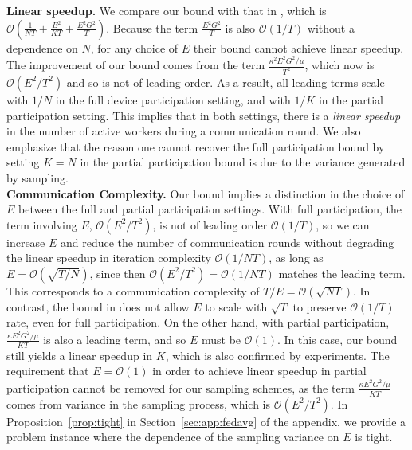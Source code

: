 \textbf{Linear speedup. }We compare our bound with that in \cite{li2019convergence},
which is $\mathcal{O}(\frac{1}{NT}+\frac{E^{2}}{KT}+\frac{E^{2}G^{2}}{T})$.
Because the term $\frac{E^{2}G^{2}}{T}$ is also $\mathcal{O}(1/T)$
without a dependence on $N$, for any choice of $E$ their bound cannot
achieve linear speedup. The improvement of our bound comes from the
term $\frac{\kappa^{2}E^{2}G^{2}/\mu}{T^{2}}$, which now is $\mathcal{O}(E^{2}/T^{2})$ and so is not of leading order. As a result, all leading terms scale with $1/N$ in the full device
participation setting, and with $1/K$ in the partial participation
setting. This implies that in both settings, there is a \emph{linear
	speedup} in the number of active workers during a communication
round. We also emphasize that the reason one cannot recover the full participation bound by setting $K=N$ in the partial participation bound is due to the variance generated by sampling. \\
\textbf{Communication Complexity.} Our bound implies a distinction
in the choice of $E$ between the full and partial participation settings.
With full participation, the term involving $E$, $\mathcal{O}(E^{2}/T^{2})$, is not of leading order $\mathcal{O}(1/T)$, so we can increase $E$ and reduce the number of communication rounds without degrading the linear speedup in iteration complexity $\mathcal{O}(1/NT)$, as long as $E=\mathcal{O}(\sqrt{T/N})$, since then $\mathcal{O}(E^{2}/T^{2})=\mathcal{O}(1/NT)$
matches the leading term. This corresponds to a communication complexity
of $T/E=\mathcal{O}(\sqrt{NT})$. In contrast, the bound in \cite{li2019convergence}
does not allow $E$ to scale with $\sqrt{T}$ to preserve $\mathcal{O}(1/T)$
rate, even for full participation. On the other hand, with partial
participation, $\frac{\kappa E^{2}G^{2}/\mu}{KT}$ is also a leading
term, and so $E$ must be $\mathcal{O}(1)$. In this case, our bound
still yields a linear speedup in $K$, which is also confirmed by
experiments. The requirement that $E=\mathcal{O}(1)$ in order to achieve linear speedup in partial participation cannot be removed for our sampling schemes, as the term $\frac{\kappa E^{2}G^{2}/\mu}{KT}$ comes from variance in the sampling process, which is $\mathcal{O}(E^{2}/T^{2})$. In Proposition~\ref{prop:tight} in Section~\ref{sec:app:fedavg} of the appendix, we provide a problem instance where the dependence of the sampling variance on $E$ is tight.  \\
